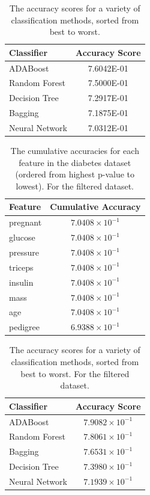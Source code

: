 \documentclass[twoside,twocolumn,10pt]{revtex4-1}
\begin{document}
	\begin{table}[H]
	\center
		\begin{tabular}{l c}
		\textbf{Classifier} & \textbf{Accuracy Score} \\
		\hline
		ADABoost        &       7.6042E-01  \\ 
	   	Random Forest   &       7.5000E-01   \\
	   	Decision Tree   &       7.2917E-01   \\
	   	Bagging         &       7.1875E-01   \\
	   	Neural Network  &      7.0312E-01
		\end{tabular}
		\caption{The accuracy scores for a variety of classification methods, sorted from best to worst.  \label{table_10}}
	\end{table}
	
	\begin{table}[H]
	\center
		\begin{tabular}{l c}	
		\textbf{Feature} & \textbf{Cumulative Accuracy} \\
		\hline
		pregnant & $7.0408 \times 10^{-1}$ \\
		glucose & $7.0408 \times 10^{-1}$ \\
		pressure & $7.0408 \times 10^{-1}$ \\
		triceps & $7.0408 \times 10^{-1}$ \\
		insulin & $7.0408 \times 10^{-1}$ \\
		mass & $7.0408 \times 10^{-1}$ \\
		age & $7.0408 \times 10^{-1}$ \\
		pedigree & $6.9388 \times 10^{-1} $
		\end{tabular}
		\caption{The cumulative accuracies for each feature in the diabetes dataset (ordered from highest p-value to lowest). For the filtered dataset.\label{table_11}}
	\end{table}
	
	\begin{table}[H]
	\center
		\begin{tabular}{l c}
		\textbf{Classifier} & \textbf{Accuracy Score} \\
		\hline
		ADABoost        &       $7.9082 \times 10^{-1}$   \\ 
	   	Random Forest   &       $7.8061 \times 10^{-1}$  \\
	   	Bagging   		&       $7.6531 \times 10^{-1}$   \\
	   	Decision Tree   &       $7.3980 \times 10^{-1}$   \\
	   	Neural Network  &       $7.1939 \times 10^{-1}$ 
		\end{tabular}
		\caption{The accuracy scores for a variety of classification methods, sorted from best to worst. For the filtered dataset.\label{table_12}}
	\end{table}	
	
\end{document}
